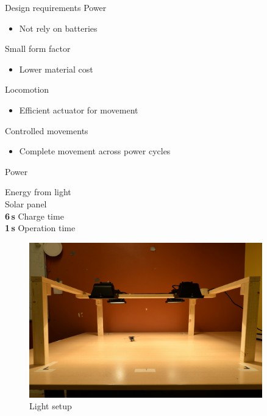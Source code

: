 \documentclass{beamer}
\begin{document}
\begin{frame}{Design requirements}
	Power \\
	\begin{itemize}
		\item Not rely on batteries
	\end{itemize}
	Small form factor \\
	\begin{itemize}
		\item Lower material cost
	\end{itemize}
    Locomotion \\
    \begin{itemize}
    	\item Efficient actuator for movement
    \end{itemize}
    Controlled movements \\
    \begin{itemize}
    	\item Complete movement across power cycles
    \end{itemize}
\end{frame}

\begin{frame}{Power}
	\vspace{1em}
	\begin{minipage}{0.45\textwidth}
		Energy from light \\
		
		Solar panel \\
		
		\textbf{6\,s} Charge time \\
		
		\textbf{1\,s} Operation time \\
		
	\end{minipage}
	\begin{minipage}{0.54\textwidth}\raggedleft
		\begin{figure}
			\includegraphics[width=0.9\textwidth]{pics/light_setup.jpg}
			\caption*{Light setup}
		\end{figure}
	\end{minipage}
\end{frame}
\end{document}
